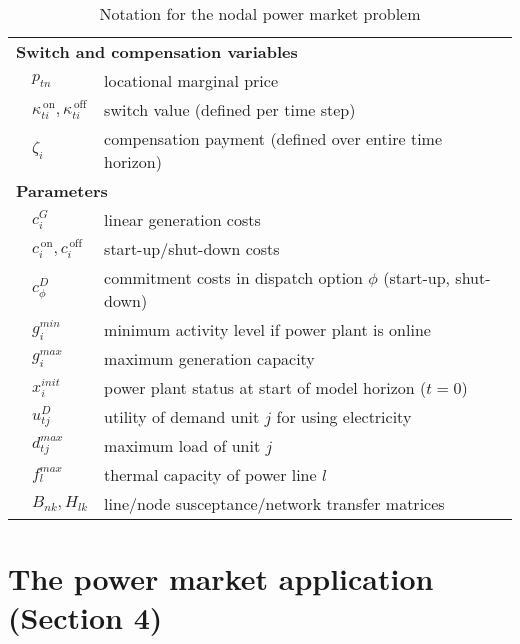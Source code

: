 \documentclass[9pt,a4paper]{article}
\newcommand{\on}{^{\,\text{on}}}
\newcommand{\off}{^{\,\text{off}}}
\begin{document}
\begin{table}
\begin{center}
\begin{small}
\begin{tabular}{p{0.1 cm}p{1.9 cm}@{ ... }p{8.5 cm}}
				\hline
				\multicolumn{3}{l}{\textbf{Switch and compensation variables}} \\
				&$p_{tn}$		& locational marginal price \\
				&$\kappa\on_{ti},\kappa\off_{ti}$	& switch value (defined per time step)\\
				&$\zeta_{i}$ & compensation payment (defined over entire time horizon) \\
				\hline
				\multicolumn{3}{l}{\textbf{Parameters}} \\
				&$c^G_{i}$		& linear generation costs \\
				&$c\on_i,c\off_i$		& start-up/shut-down costs \\
				&$c^D_{\phi}$		& commitment costs in dispatch option $\phi$ (start-up, shut-down)\\
				&$g^{min}_i$		& minimum activity level if power plant is online \\
				&$g^{max}_i$		& maximum generation capacity \\
				&$x^{init}_i$		& power plant status at start of model horizon ($t=0$)\\
				&$u^D_{tj}$			& utility of demand unit $j$ for using electricity \\
				&$d^{max}_{tj}$	& maximum load of unit $j$ \\
				&$f^{max}_l$		& thermal capacity of power line $l$ \\
				&$B_{nk},H_{lk}$			& line/node susceptance/network transfer matrices \\
				\hline
				\hline
			\end{tabular}
		\end{small}
		\caption{Notation for the nodal power market problem} \label{table:example:notation}
	\end{center}
\end{table}

\section*{The power market application (Section 4)} \label{sec:example}
\setcounter{equation}{15}
\end{document}
